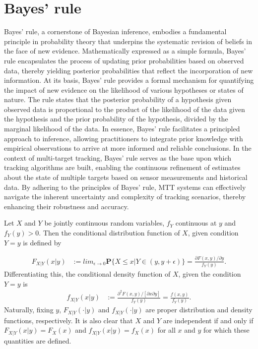     \section{Bayes' rule}
Bayes' rule, a cornerstone of Bayesian inference, embodies a fundamental principle in probability theory that underpins the systematic revision of beliefs in the face of new evidence. Mathematically expressed as a simple formula, Bayes' rule encapsulates the process of updating prior probabilities based on observed data, thereby yielding posterior probabilities that reflect the incorporation of new information. At its basis, Bayes' rule provides a formal mechanism for quantifying the impact of new evidence on the likelihood of various hypotheses or states of nature. The rule states that the posterior probability of a hypothesis given observed data is proportional to the product of the likelihood of the data given the hypothesis and the prior probability of the hypothesis, divided by the marginal likelihood of the data. In essence, Bayes' rule facilitates a principled approach to inference, allowing practitioners to integrate prior knowledge with empirical observations to arrive at more informed and reliable conclusions. In the context of multi-target tracking, Bayes' rule serves as the base upon which tracking algorithms are built, enabling the continuous refinement of estimates about the state of multiple targets based on sensor measurements and historical data. By adhering to the principles of Bayes' rule, MTT systems can effectively navigate the inherent uncertainty and complexity of tracking scenarios, thereby enhancing their robustness and accuracy.
    \begin{definition}
    Let $X$ and $Y$ be jointly continuous random variables, $f_Y$ continuous at $y$ and $f_Y(y) > 0$. Then the conditional distribution function of $X$, given condition ${Y=y}$ is defined by
    \end{definition}
    \begin{align}
        F_{X|Y}(x|y) &:= lim_{\epsilon\to0} \textbf{P}\{X\leq x | Y \in (y, y + \epsilon)\} = \frac{\partial F(x,y) / \partial y}{f_Y(y)}.\label{eq:conditional_distribution}
    \end{align}
    Differentiating this, the conditional density function of $X$, given the condition ${Y = y}$ is
    \begin{align}
        f_{X|Y}(x|y) &:= \frac{\partial^2 F(x,y) / [\partial x \partial y]}{f_Y(y)} = \frac{f(x,y)}{f_Y(y)}. \label{eq:conditional_distribution2}
    \end{align}
    Naturally, fixing $y$, $F_{X|Y}(\cdot|y)$ and $f_{X|Y}(\cdot|y)$ are proper distribution and density functions, respectively. It is also clear that $X$ and $Y$ are independent if and only if $F_{X|Y}(x|y) = F_X(x)$ and $f_{X|Y}(x|y) = f_X(x)$ for all $x$ and $y$ for which these quantities are defined.

